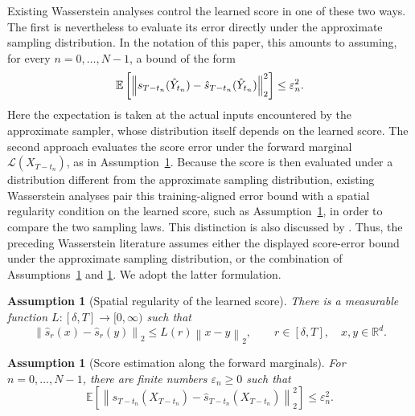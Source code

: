 \documentclass[11pt]{article}
\newtheorem{assumption}[theorem]{Assumption}
\theoremstyle{definition}
\newcommand{\R}{\mathbb{R}}
\newcommand{\E}{\mathbb{E}}
\newcommand{\Law}{\mathcal{L}}
\newcommand{\norm}[1]{\left\lVert #1\right\rVert_2}
\begin{document}
Existing Wasserstein analyses control the learned score in one of
these two ways. The first is nevertheless to evaluate its error
directly under the approximate sampling distribution. In the notation
of this paper, this amounts to assuming, for every
$n=0,\ldots,N-1$, a bound of the form
\begin{align}
    \E\left[
        \norm{
            s_{T-t_n}(\hat Y_{t_n})
            -\hat s_{T-t_n}(\hat Y_{t_n})
        }^2
    \right]
    \le \varepsilon_n^2.
    \notag
\end{align}
Here the expectation is taken at the actual inputs encountered by the
approximate sampler, whose distribution itself depends on the learned
score. The second approach evaluates the score error under the forward
marginal $\Law(X_{T-t_n})$, as in
Assumption~\ref{ass:score-error}. Because the score is then evaluated
under a distribution different from the approximate sampling
distribution, existing Wasserstein analyses pair this
training-aligned error bound with a spatial regularity condition on
the learned score, such as Assumption~\ref{ass:lipschitz}, in order to
compare the two sampling laws. This distinction is also discussed by
\citet[Section~2.2]{koike2026wasserstein}. Thus, the preceding
Wasserstein literature assumes either the displayed score-error bound
under the approximate sampling distribution, or the combination of
Assumptions~\ref{ass:lipschitz} and \ref{ass:score-error}. We adopt the
latter formulation.

\begin{assumption}[Spatial regularity of the learned score]
\label{ass:lipschitz}
There is a measurable function $L:[\delta,T]\to[0,\infty)$ such that
\begin{equation}
    \norm{\hat s_r(x)-\hat s_r(y)}
    \le L(r)\norm{x-y},
    \qquad r\in[\delta,T],\quad x,y\in\R^d.
    \label{eq:lipschitz-score}
\end{equation}
\end{assumption}

\begin{assumption}[Score estimation along the forward marginals]
\label{ass:score-error}
For $n=0,\dots,N-1$, there are finite numbers $\varepsilon_n\ge0$ such that
\begin{equation}
    \E\left[
    \norm{s_{T-t_n}(X_{T-t_n})-
    \hat s_{T-t_n}(X_{T-t_n})}^2
    \right]\le\varepsilon_n^2.
    \label{eq:score-error}
\end{equation}
\end{assumption}
\end{document}
